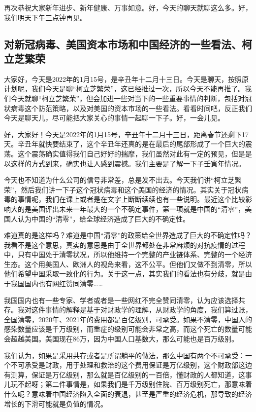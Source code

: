 \documentclass[UTF8, 12pt, a4paper]{ctexrep}
\begin{document}
再次恭祝大家新年进步、新年健康、万事如意。好，今天的聊天就聊这么多。好，我们明天下午三点钟再见。

\subsection{对新冠病毒、美国资本市场和中国经济的一些看法、柯立芝繁荣}

大家好，今天是2022年的1月15号，是辛丑年十二月十三日。今天是聊天，按照原计划呢，我们今天是聊“柯立芝繁荣”，这已经推过一次，所以今天不能再推了。我们今天就聊“柯立芝繁荣”，但会加进一些对当下的一些重要事情的判断，包括对冠状病毒这个防范策略，以及对美国的资本市场的一些看法。看看时间吧，反正我们今天是聊天儿，尽可能把大家关心的事情一起聊一下子。好，一会儿见。

好，大家好！今天是2022年的1月15号，辛丑年十二月十三日，距离春节还剩下17天。辛丑年就快要结束了，这个辛丑年还真的是在最后的尾部形成了一个巨大的震荡。这个震荡确实值得我们自己好好的揣摩，我们虽然对此有一定的预见，但是是以这样的方式到来，确实也让人感到震撼。我们主要是了解一下子壬寅年情况。

今天也不知道为什么公司的信号非常差，总是发不出去。今天我们讲“柯立芝繁荣”，然后我们讲一下子这个冠状病毒和这个美国的经济的情况。其实关于冠状病毒的事情呢，我们在课上或者是在文字上断断续续也有一些说明。最近这个比较影响大的是美国评出未来一年最大的一个不确定事件，第一项就是中国的“清零”，美国人认为中国的“清零”，给全球经济造成了巨大的不确定性。

难道真的是这样吗？难道是中国“清零”的政策给全世界造成了巨大的不确定性吗？我看不是这个意思，真实的意思是由于全世界都处在非常麻烦的对抗疫情的过程中，只有中国处于清零状况，所以他维持一个完整的产业链体系、完整的一个经济生态。这个用美国人、欧洲人的视角来看，这不公平。但他们又做不到清零，所以他们希望中国采取一致化的行为。关于这一点，其实我们的看法也有分歧，就是由于我国国内也有网红赞同清零……

我国国内也有一些专家、学者或者是一些网红不完全赞同清零，认为应该选择共存。我对这件事情的解释是基于对财政学的理解，从财政学的角度，我们算过账，全国清零，2020年、2021年的费用都是百亿级别，可承受。如果不清零，中国人的感染数量应该是千万级别，而重症的级别可能会非常之高，而这个死亡的数量可能会超越美国。美国现在86万，因为中国人口基数大，那么可能也是百万级别。

我们认为，如果是采用共存或者是所谓躺平的做法，那么中国有两个不可承受：一个不可承受是财政，用于处理和救治的这个费用保证是万亿级别，这个财政部这边有测算，保证是万亿级别，那么就是百亿级别的一百倍，懂财政的人都知道，这事儿玩不起呀；第二件事情是，如果我们是千万级别住院、百万级别死亡，那意味着什么呢？意味着中国经济陷入全面的衰退，甚至是严重的经济危机，那导致的经济增长的下滑可能就是负值的情况。
\end{document}
